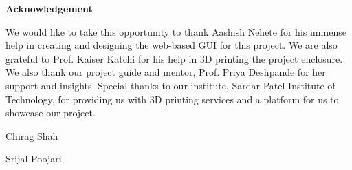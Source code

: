 \newpage
\thispagestyle{empty}
\vspace*{3in}
\begin{normalsize}
	
\centerline{\textbf{Acknowledgement}}
\vspace{2cm}
\end{normalsize}

\par We would like to take this opportunity to thank Aashish Nehete for his immense help in creating and designing the web-based GUI for this project. We are also grateful to Prof. Kaiser Katchi for his help in 3D printing the project enclosure. We also thank our project guide and mentor, Prof. Priya Deshpande for her support and insights.
Special thanks to our institute, Sardar Patel Institute of Technology, for providing us with 3D printing services and a platform for us to showcase our project.

\vspace{2cm}

\hspace*{4in}  Chirag Shah

\hspace*{4in}  Srijal Poojari
